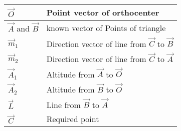 \begin{table}[H]
    \centering
    \begin{tabular}{|l|l|}
    \hline
      $\vec{O}$   & Poiint vector of orthocenter \\
      \hline
      $\vec{A}$ and $\vec{B}$   & known vector of Points of triangle\\
      \hline
      $\vec{m}_1$ & Direction vector of line from $\vec{C}$ to $\vec{B}$\\
      \hline
      $\vec{m}_2$ & Direction vector of line from $\vec{C}$ to $\vec{A}$\\
      \hline
      $\vec{A}_1$ & Altitude from $\vec{A}$ to $\vec{O}$\\
      \hline
      $\vec{A}_2$ & Altitude from $\vec{B}$ to $\vec{O}$\\
      \hline
      $\vec{L}$ & Line from $\vec{B}$ to $\vec{A}$\\
      \hline
      $\vec{C}$ & Required point\\
      \hline
    \end{tabular}
    \caption{}
    \label{tab:tables/table.tex}
\end{table}